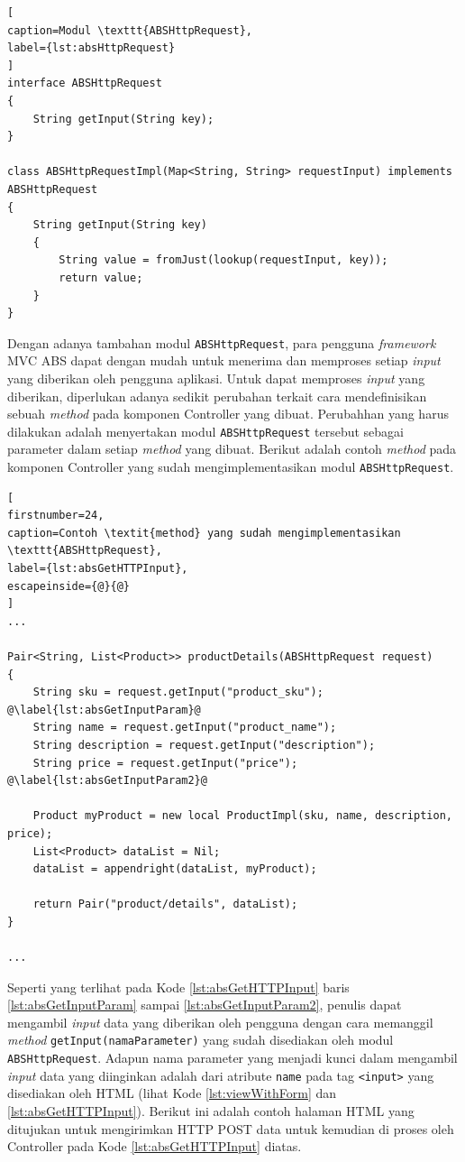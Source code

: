 \begin{lstlisting}[
caption=Modul \texttt{ABSHttpRequest},
label={lst:absHttpRequest}
]
interface ABSHttpRequest
{
	String getInput(String key);
}

class ABSHttpRequestImpl(Map<String, String> requestInput) implements ABSHttpRequest
{
	String getInput(String key)
	{
		String value = fromJust(lookup(requestInput, key));
		return value;
	}
}
\end{lstlisting}

Dengan adanya tambahan modul \texttt{ABSHttpRequest}, para pengguna \textit{framework} MVC ABS dapat dengan mudah untuk menerima dan memproses setiap \textit{input} yang diberikan oleh pengguna aplikasi. Untuk dapat memproses \textit{input} yang diberikan, diperlukan adanya sedikit perubahan terkait cara mendefinisikan sebuah \textit{method} pada komponen Controller yang dibuat. Perubahhan yang harus dilakukan adalah menyertakan modul \texttt{ABSHttpRequest} tersebut sebagai parameter dalam setiap \textit{method} yang dibuat. Berikut adalah contoh \textit{method} pada komponen Controller yang sudah mengimplementasikan modul \texttt{ABSHttpRequest}.

\begin{lstlisting}[
firstnumber=24,
caption=Contoh \textit{method} yang sudah mengimplementasikan \texttt{ABSHttpRequest},
label={lst:absGetHTTPInput},
escapeinside={@}{@}
]
...

Pair<String, List<Product>> productDetails(ABSHttpRequest request)
{
	String sku = request.getInput("product_sku"); @\label{lst:absGetInputParam}@
	String name = request.getInput("product_name");
	String description = request.getInput("description");
	String price = request.getInput("price"); @\label{lst:absGetInputParam2}@
	
	Product myProduct = new local ProductImpl(sku, name, description, price);
	List<Product> dataList = Nil;
	dataList = appendright(dataList, myProduct);
	
	return Pair("product/details", dataList);
}

...
\end{lstlisting}

Seperti yang terlihat pada Kode \ref{lst:absGetHTTPInput} baris \ref{lst:absGetInputParam} sampai \ref{lst:absGetInputParam2}, penulis dapat mengambil \textit{input} data yang diberikan oleh pengguna dengan cara memanggil \textit{method} \texttt{getInput(namaParameter)} yang sudah disediakan oleh modul \texttt{ABSHttpRequest}. Adapun nama parameter yang menjadi kunci dalam mengambil \textit{input} data yang diinginkan adalah dari atribute \texttt{name} pada tag \texttt{<input>} yang disediakan oleh HTML (lihat Kode \ref{lst:viewWithForm} dan \ref{lst:absGetHTTPInput}). Berikut ini adalah contoh halaman HTML yang ditujukan untuk mengirimkan HTTP POST data untuk kemudian di proses oleh Controller pada Kode \ref{lst:absGetHTTPInput} diatas.

